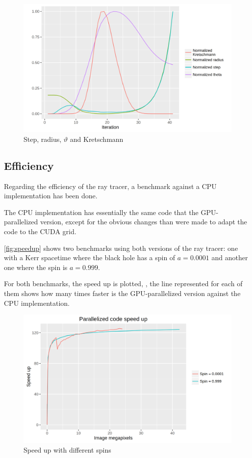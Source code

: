 \begin{figure}[bth]
\myfloatalign
\includegraphics[width=\linewidth]{gfx/kretschmann}
\caption[Step, $r$, $\vartheta$ and Kretschmann]{Step, radius, $\vartheta$ and Kretschmann}
\label{fig:kretschmann}
\end{figure}

\subsection{Efficiency}

Regarding the efficiency of the ray tracer, a benchmark against a \ac{CPU} implementation has been done.

The \ac{CPU} implementation has essentially the same code that the \ac{GPU}-parallelized version, except for the obvious changes than were made to adapt the code to the \ac{CUDA} grid.

\autoref{fig:speedup} shows two benchmarks using both versions of the ray tracer: one with a Kerr spacetime where the black hole has a spin of $a = 0.0001$ and another one where the spin is $a = 0.999$.

For both benchmarks, the speed up is plotted, \ie, the line represented for each of them shows how many times faster is the \ac{GPU}-parallelized version against the \ac{CPU} implementation.

\begin{figure}[bth]
	\myfloatalign
	\includegraphics[width=.8\linewidth]{gfx/speedup}
	\caption[Speed up with different spins]{Speed up with different spins}
	\label{fig:speedup}
\end{figure}

